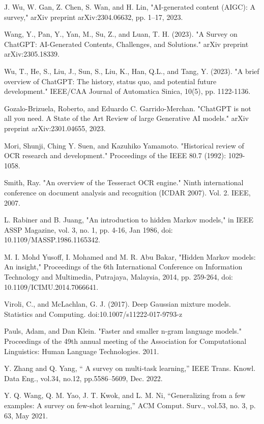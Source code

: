 \documentclass[conference]{IEEEtran}
\begin{document}
\begin{thebibliography}{00}
 J. Wu, W. Gan, Z. Chen, S. Wan, and H. Lin, "AI-generated content (AIGC): A survey," arXiv preprint arXiv:2304.06632, pp. 1–17, 2023.

 Wang, Y., Pan, Y., Yan, M., Su, Z., and Luan, T. H. (2023). "A Survey on ChatGPT: AI-Generated Contents, Challenges, and Solutions." arXiv preprint arXiv:2305.18339.

 Wu, T., He, S., Liu, J., Sun, S., Liu, K., Han, Q.L., and Tang, Y. (2023). "A brief overview of ChatGPT: The history, status quo, and potential future development." IEEE/CAA Journal of Automatica Sinica, 10(5), pp. 1122-1136.

 Gozalo-Brizuela, Roberto, and Eduardo C. Garrido-Merchan. "ChatGPT is not all you need. A State of the Art Review of large Generative AI models." arXiv preprint arXiv:2301.04655, 2023.

 Mori, Shunji, Ching Y. Suen, and Kazuhiko Yamamoto. "Historical review of OCR research and development." Proceedings of the IEEE 80.7 (1992): 1029-1058.

 Smith, Ray. "An overview of the Tesseract OCR engine." Ninth international conference on document analysis and recognition (ICDAR 2007). Vol. 2. IEEE, 2007.

 L. Rabiner and B. Juang, "An introduction to hidden Markov models," in IEEE ASSP Magazine, vol. 3, no. 1, pp. 4-16, Jan 1986, doi: 10.1109/MASSP.1986.1165342.

 M. I. Mohd Yusoff, I. Mohamed and M. R. Abu Bakar, "Hidden Markov models: An insight," Proceedings of the 6th International Conference on Information Technology and Multimedia, Putrajaya, Malaysia, 2014, pp. 259-264, doi: 10.1109/ICIMU.2014.7066641.

 Viroli, C., and  McLachlan, G. J. (2017). Deep Gaussian mixture models. Statistics and Computing. doi:10.1007/s11222-017-9793-z

Pauls, Adam, and Dan Klein. "Faster and smaller n-gram language models." Proceedings of the 49th annual meeting of the Association for Computational Linguistics: Human Language Technologies. 2011.

  Y. Zhang and Q. Yang, “ A survey on multi-task learning,” IEEE Trans. Knowl. Data Eng., vol.34, no.12, pp.5586–5609, Dec. 2022.

 Y. Q. Wang, Q. M. Yao, J. T. Kwok, and L. M. Ni, “Generalizing from a few examples: A survey on few-shot learning,” ACM Comput. Surv., vol.53, no. 3, p. 63, May 2021.


\end{thebibliography}
\end{document}
